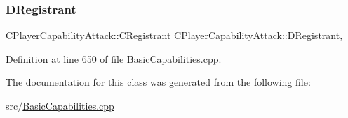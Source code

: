 \subsubsection{\texorpdfstring{D\+Registrant}{DRegistrant}}
{\footnotesize\ttfamily \hyperlink{classCPlayerCapabilityAttack_1_1CRegistrant}{C\+Player\+Capability\+Attack\+::\+C\+Registrant} C\+Player\+Capability\+Attack\+::\+D\+Registrant\hspace{0.3cm}{\ttfamily [static]}, {\ttfamily [protected]}}



Definition at line 650 of file Basic\+Capabilities.\+cpp.



The documentation for this class was generated from the following file\+:\begin{DoxyCompactItemize}
\item 
src/\hyperlink{BasicCapabilities_8cpp}{Basic\+Capabilities.\+cpp}\end{DoxyCompactItemize}
